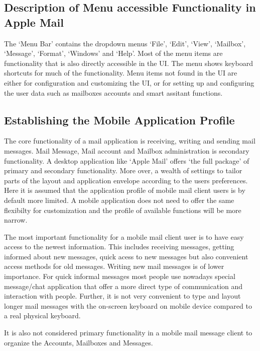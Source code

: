 \documentclass[a4paper,11pt,twoside]{article}
\begin{document}
\subsection{Description of Menu accessible Functionality in Apple Mail}
The `Menu Bar' contains the dropdown menus `File', `Edit', `View', `Mailbox',
`Message', `Format', `Windows' and `Help'. Most of the menu items are functionality
that is also directly accessible in the UI. The menu shows keyboard shortcuts for
much of the functionality. Menu items not found in the UI are either for
configuration and customizing the UI, or for setting up and configuring the user
data such as mailboxes accounts and smart assitant functions.


\subsection{Establishing the Mobile Application Profile}
The core functionality of a mail application is receiving, writing and sending
mail messages. Mail Message, Mail account and Mailbox administration is
secondary functionality. A desktop application like `Apple Mail' offers `the
full package' of primary and secondary functionality. More over, a wealth of
settings to tailor parts of the layout and application envelope according to the
users preferences. Here it is assumed that the application profile of mobile
mail client users is by default more limited. A mobile application does not need
to offer the same flexibilty for customization and the profile of available
functions will be more narrow.

The most important functionality for a mobile mail client user is to have easy
access to the newest information. This includes receiving messages, getting
informed about new messages, quick acess to new messages but also convenient
access methods for old messages. Writing new mail messages is of lower
importance. For quick informal messages most people use nowadays special
message/chat application that offer a more direct type of communication and
interaction with people. Further, it is not very convenient to type and layout
longer mail messages with the on-screen keyboard on mobile device compared to a
real physical keyboard.

It is also not considered primary functionality in a mobile mail message client
to organize the Accounts, Mailboxes and Messages.
\end{document}
